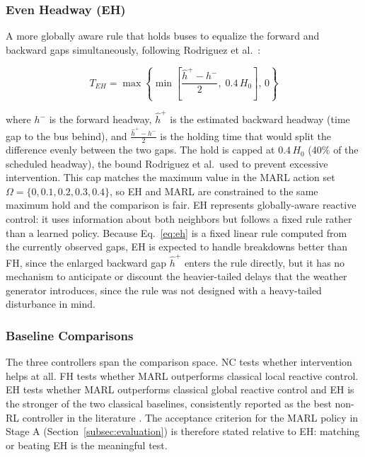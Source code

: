 \subsubsection{Even Headway (EH)}

A more globally aware rule that holds buses to equalize the forward and backward gaps simultaneously, following Rodriguez et al.~\cite{Rodriguez2023Cooperative}:

\begin{equation}
T_{EH} = \max\!\left\{\min\!\left[\frac{\hat{h}^+ - h^-}{2},\; 0.4\,H_0\right],\, 0\right\}
\label{eq:eh}
\end{equation}

where $h^-$ is the forward headway, $\hat{h}^+$ is the estimated backward headway (time gap to the bus behind), and $\frac{\hat{h}^+ - h^-}{2}$ is the holding time that would split the difference evenly between the two gaps. The hold is capped at $0.4\,H_0$ (40\% of the scheduled headway), the bound Rodriguez et al.\ used to prevent excessive intervention. This cap matches the maximum value in the MARL action set $\Omega = \{0, 0.1, 0.2, 0.3, 0.4\}$, so EH and MARL are constrained to the same maximum hold and the comparison is fair. EH represents globally-aware reactive control: it uses information about both neighbors but follows a fixed rule rather than a learned policy. Because Eq.~\eqref{eq:eh} is a fixed linear rule computed from the currently observed gaps, EH is expected to handle breakdowns better than FH, since the enlarged backward gap $\hat{h}^+$ enters the rule directly, but it has no mechanism to anticipate or discount the heavier-tailed delays that the weather generator introduces, since the rule was not designed with a heavy-tailed disturbance in mind.
\clearpage
\subsubsection{Baseline Comparisons}

The three controllers span the comparison space. NC tests whether intervention helps at all. FH tests whether MARL outperforms classical local reactive control. EH tests whether MARL outperforms classical global reactive control and EH is the stronger of the two classical baselines, consistently reported as the best non-RL controller in the literature \cite{Wangsun,Rodriguez2023Cooperative}. The acceptance criterion for the MARL policy in Stage A (Section~\ref{subsec:evaluation}) is therefore stated relative to EH: matching or beating EH is the meaningful test.

